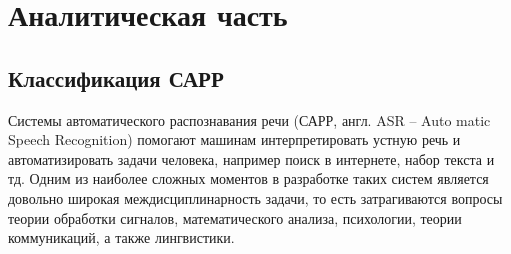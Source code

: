 \chapter{Аналитическая часть}

\section{Классификация САРР}
Системы автоматического распознавания речи (САРР, англ. ASR -- Auto matic Speech Recognition) помогают машинам интерпретировать устную речь и автоматизировать задачи человека, например поиск в интернете, набор текста и тд. Одним из наиболее сложных моментов в разработке таких систем является довольно широкая междисциплинарность задачи, то есть затрагиваются вопросы теории обработки сигналов, математического анализа, психологии, теории коммуникаций, а также лингвистики.

